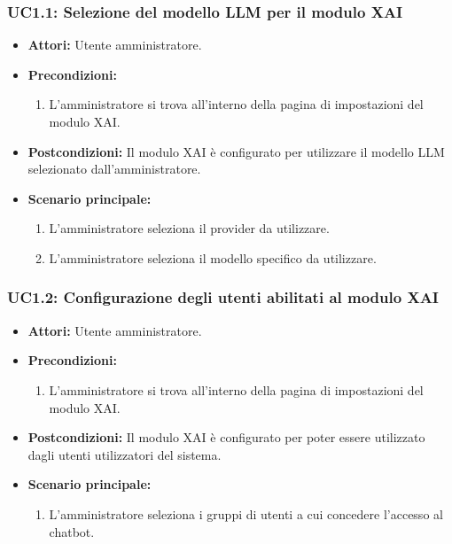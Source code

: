 \subsubsection{UC1.1: Selezione del modello LLM per il modulo XAI}
\label{uc:uc1.1}
    \begin{itemize}
        \item \textbf{Attori:} Utente amministratore.
        \item \textbf{Precondizioni:} 
            \begin{enumerate}
                \item L'amministratore si trova all'interno della pagina di impostazioni del modulo XAI.
            \end{enumerate}
        \item \textbf{Postcondizioni:} Il modulo XAI è configurato per utilizzare il modello LLM selezionato dall'amministratore.
        \item \textbf{Scenario principale:}
            \begin{enumerate}
                \item L'amministratore seleziona il provider da utilizzare.
                \item L'amministratore seleziona il modello specifico da utilizzare.
            \end{enumerate}
    \end{itemize}
    

\subsubsection{UC1.2: Configurazione degli utenti abilitati al modulo XAI}
\label{uc:uc1.2}
    \begin{itemize}
        \item \textbf{Attori:} Utente amministratore.
        \item \textbf{Precondizioni:} 
            \begin{enumerate}
                \item L'amministratore si trova all'interno della pagina di impostazioni del modulo XAI.
            \end{enumerate}
        \item \textbf{Postcondizioni:} Il modulo XAI è configurato per poter essere utilizzato dagli utenti utilizzatori del sistema.
        \item \textbf{Scenario principale:}
            \begin{enumerate}
                \item L'amministratore seleziona i gruppi di utenti a cui concedere l'accesso al chatbot.
            \end{enumerate}
    \end{itemize}
    

